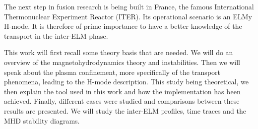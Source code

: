 The next step in fusion research is being built in France, the famous International Thermonuclear Experiment Reactor (ITER). Its operational scenario is an ELMy H-mode. It is therefore of prime importance to have a better knowledge of the transport in the inter-ELM phase.

This work will first recall some theory basis that are needed. We will do an overview of the magnetohydrodynamics theory and instabilities. Then we will speak about the plasma confinement, more specifically of the transport phenomena, leading to the H-mode description. This study being theoretical, we then explain the tool used in this work and how the implementation has been achieved. Finally, different cases were studied and comparisons between these results are presented. We will study the inter-ELM profiles, time traces and the MHD stability diagrams.
